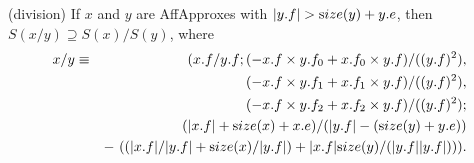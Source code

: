 \begin{proposition}{\label{GMT prop6.8} {\textrm (division)}} If $x$ and $y$ are {\textrm AffApproxes}  with $|y.f| > {\textrm size}(y) + y.e${\textrm ,}
 then $S(x / y) \supseteq
S(x) / S(y)${\textrm ,} where
\begin{eqnarray*}
x / y &\equiv& (x.f / y.f; (-x.f \times y.f_0 + x.f_0 \times y.f)/((y.f)^2),\\&&\qquad  
(-x.f \times y.f_1 + x.f_1 \times y.f)/((y.f)^2), 
\\
&&\qquad 
(-x.f \times y.f_2 + x.f_2 \times y.f)/((y.f)^2); 
\\
&&\qquad (|x.f| + {\textrm size}(x) + x.e) /(|y.f| - ({\textrm size}(y) + y.e))\\
&&  - \
((|x.f|/|y.f| + {\textrm size}(x)/|y.f|) + |x.f| {\textrm size}(y)/(|y.f||y.f|))).
                                           \end{eqnarray*}
\end{proposition}


